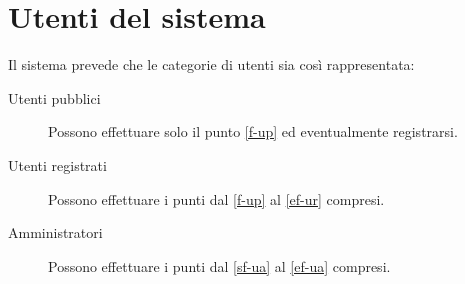 \section{Utenti del sistema}
Il sistema prevede che le categorie di utenti sia così rappresentata:

\begin{description}
	
	\item[Utenti pubblici] Possono effettuare solo il punto \ref{f-up} ed eventualmente registrarsi.
	
	\item[Utenti registrati] Possono effettuare i punti dal \ref{f-up} al \ref{ef-ur} compresi.
	
	\item[Amministratori] Possono effettuare i punti dal \ref{sf-ua} al \ref{ef-ua} compresi.
	
\end{description}